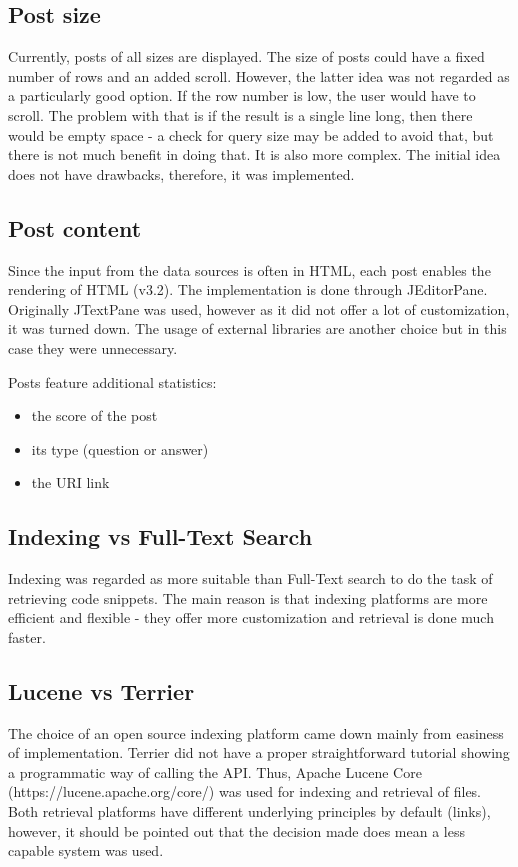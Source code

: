 \documentclass{l4proj}
\begin{document}
\subsection{Post size}
Currently, posts of all sizes are displayed. The size of posts could have a fixed number of rows and an added scroll. However, the latter idea was not regarded as a particularly good option. If the row number is low, the user would have to scroll. The problem with that is if the result is a single line long, then there would be empty space - a check for query size may be added to avoid that, but there is not much benefit in doing that. It is also more complex. The initial idea does not have drawbacks, therefore, it was implemented.

\subsection{Post content}
Since the input from the data sources is often in HTML, each post enables the rendering of HTML (v3.2). The implementation is done through JEditorPane. Originally JTextPane was used, however as it did not offer a lot of customization, it was  turned down. The usage of external libraries are another choice but in this case they were unnecessary.

Posts feature additional statistics:
\begin{itemize}
\item the score of the post
\item its type (question or answer)
\item the URI link
\end{itemize}

\subsection{Indexing vs Full-Text Search}
Indexing was regarded as more suitable than Full-Text search to do the task of retrieving code snippets. The main reason is that indexing platforms are more efficient and flexible - they offer more customization and retrieval is done much faster.

\subsection{Lucene vs Terrier}
The choice of an open source indexing platform came down mainly from easiness of implementation. Terrier did not have a proper straightforward tutorial showing a programmatic way of calling the API. Thus, Apache Lucene Core (https://lucene.apache.org/core/) was used for indexing and retrieval of files. Both retrieval platforms have different underlying principles by default (links), however, it should be pointed out that the decision made does mean a less capable system was used.
\end{document}
